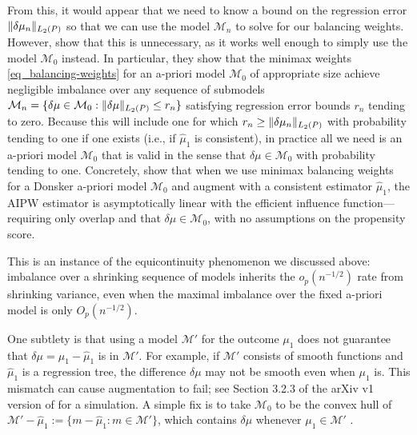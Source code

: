 \documentclass{article}
\DeclarePairedDelimiter\norm{\lVert}{\rVert}
\theoremstyle{definition}
\newcommand{\dm}{\delta \mu}
\newcommand{\model}{\mathcal{M}}
\newcommand{\<}{\langle}
\renewcommand{\>}{\rangle}
\begin{document}
From this, it would appear that we need to know a bound on the regression error $\norm{\dm_n}_{L_2(P)}$ so that we can use the model $\model_n$ to solve for our balancing weights. However, \citet[see Section 2]{hirshberg2021augmented} show that this is unnecessary, as it works well enough to simply use the model $\model_0$ instead. In particular, they show that the minimax weights \eqref{eq_balancing-weights} for an a-priori model $\model_0$ of appropriate size achieve negligible imbalance over any sequence of submodels $\model_n = \{ \dm \in \model_0 : \norm{\dm}_{L_2(P)} \le r_n\}$ satisfying  regression error bounds $r_n$ tending to zero. Because this will include one for which $r_n \ge \norm{\dm_n}_{L_2(P)}$ with probability tending to one if one exists (i.e., if $\hat \mu_1$ is consistent), in practice all we need is an a-priori model $\model_0$ that is valid in the sense that
 $\dm \in \model_0$ with probability tending to one.
Concretely, \citet[Theorem 1]{hirshberg2021augmented} show that when we use minimax balancing weights for a Donsker a-priori model $\model_0$ and augment with a consistent estimator $\hat \mu_1$, the AIPW estimator is asymptotically linear with the efficient influence function---requiring only overlap and that $\dm \in \model_0$, with no assumptions on the propensity score.

This is an instance of the equicontinuity phenomenon we discussed above: imbalance over a shrinking sequence of models inherits the $o_p(n^{-1/2})$ rate from shrinking variance, even when the maximal imbalance over the fixed a-priori model is only $O_p(n^{-1/2})$.

One subtlety is that using a model $\model'$ for the outcome $\mu_1$ does not guarantee that $\dm = \mu_1 - \hat \mu_1$ is in $\model'$. For example, if $\model'$ consists of smooth functions and $\hat \mu_1$ is a regression tree, the difference $\dm$ may not be smooth even when $\mu_1$ is. This mismatch can cause augmentation to fail; see Section 3.2.3 of the arXiv v1 version of \citet{hirshberg2021augmented} for a simulation. A simple fix is to take $\model_0$ to be the convex hull of $\model' - \hat \mu_1 := \{m - \hat \mu_1 : m \in \model'\}$, which contains $\dm$ whenever $\mu_1 \in \model'$ \citep[Section 2.6]{hirshberg2021augmented}.
\end{document}
